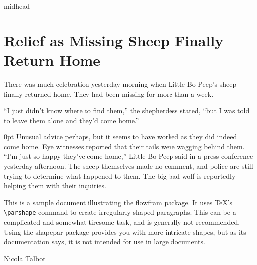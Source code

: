 \documentclass[12pt]{article}
\begin{document}
\begin{staticcontents*}{midhead}
\section{Relief as Missing Sheep Finally Return Home}
\end{staticcontents*}

There was much celebration yesterday morning when Little Bo
Peep's sheep finally returned home. They had been missing
for more than a week.

``I just didn't know where to find them,'' the shepherdess
stated, ``but I was told to leave them alone and they'd come
home.'' 

0pt \linewidth
0pt \linewidth
0pt \linewidth
0pt \linewidth
Unusual advice perhaps, but it seems to have worked
as they did indeed come home. Eye witnesses reported that their
tails were wagging behind them.
``I'm just so happy they've come home,'' Little Bo Peep said
in a press conference yesterday afternoon.
The sheep themselves made no comment, and police are%
\framebreak{}
still trying to determine what happened to them.
The big bad wolf is reportedly helping them with their inquiries.

\noindent\hrulefill

This is a sample document illustrating the 
flowfram package. It uses \TeX's \verb|\parshape| command
to create irregularly shaped paragraphs. This can be a complicated
and somewhat tiresome task, and is generally not recommended.
Using the shapepar package provides you with more intricate
shapes, but as its documentation says, it is not intended
for use in large documents.

\hfill Nicola Talbot
\end{document}
